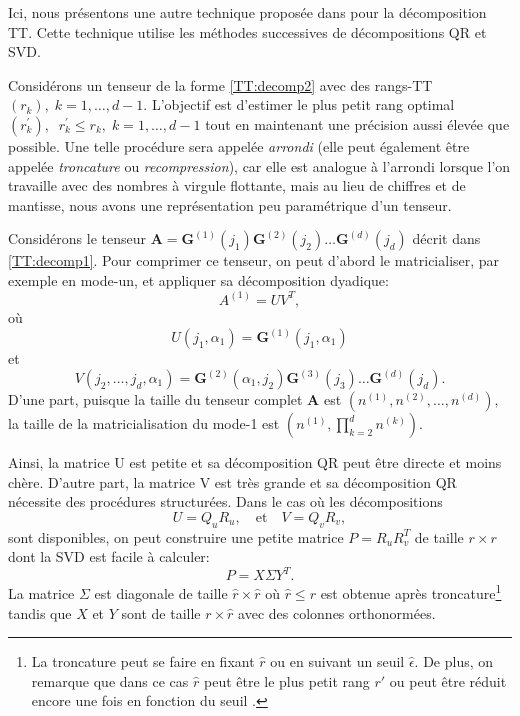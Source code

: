 \documentclass[11pt,a4paper,oneside]{book}
\def\G{\mathfrak G}
\def\G{\mathbf G}
\newcommand{\mbf}[1]{\mathbf{#1}}
\begin{document}
	Ici, nous présentons une autre technique proposée dans \cite[p.2302]{oseledets2011tensor} pour la décomposition TT. Cette technique utilise les méthodes successives de décompositions QR et SVD.
	
	 Considérons un tenseur de la forme \eqref{TT:decomp2} avec des rangs-TT $(r_k),\; k = 1,\ldots,d-1.$ L'objectif est d'estimer le
	 plus petit rang optimal $(r_k^{'}),\;\; r_k^{'} \leq r_k, \; k = 1,\ldots,d-1$ tout en maintenant une précision aussi élevée que possible. Une telle procédure sera appelée \textit{arrondi} (elle peut également être appelée \textit{troncature} ou \textit{recompression}), car elle est analogue à l'arrondi lorsque l'on travaille avec des nombres à virgule flottante, mais au lieu de chiffres et de
	 mantisse, nous avons une représentation peu paramétrique d'un tenseur.
	 
	Considérons le tenseur  $\mbf{A} = \G^{(1)}(j_1)\G^{(2)}(j_2)\ldots \G^{(d)}(j_d)$ décrit dans \eqref{TT:decomp1}. Pour comprimer ce tenseur, on peut d'abord le matricialiser, par exemple en mode-un, et appliquer sa décomposition dyadique:
		\begin{equation}
	\label{TT-dyadicMod1}
	A^{(1)} = UV^T, 
	\end{equation}
où
	\begin{equation}
	\label{dyadicDecomp1}
	U(j_1,\alpha_1) = \G^{(1)}(j_1,\alpha_1)
	\end{equation}
	et
	\begin{equation}
	\label{dyadicDecomp2}
	V(j_2,\ldots,j_d,\alpha_1) = \G^{(2)}(\alpha_1,j_2)\G^{(3)}(j_3)\ldots \G^{(d)}(j_d).
	\end{equation}
	D'une part, puisque la taille du tenseur complet $\mbf{A}$ est $(n^{(1)},n^{(2)},\ldots,n^{(d)}),$ la taille de la matricialisation du mode-1 est $(n^{(1)}, \prod_{k =2}^d n^{(k)}).$
	
	Ainsi, la matrice U est petite et sa décomposition QR peut être directe et moins chère. D'autre part, la matrice V est très grande et sa décomposition QR nécessite des procédures structurées. Dans le cas où les décompositions
	\begin{equation}
	\label{qrTTred}
	U = Q_uR_u,\quad \text{et}\quad V = Q_vR_v,
	\end{equation}
	sont disponibles, on peut construire une petite matrice   $P = R_uR_v^T$ de taille  $r \times r$ dont la SVD est facile à calculer:
	\begin{equation}
	\label{svdTTred}
	P = X\Sigma Y^T.
	\end{equation}
	La matrice $\Sigma$ est diagonale de taille $\hat{r} \times \hat{r}$ où $\hat{r} \leq r$  est obtenue après troncature\footnote{La troncature peut se faire en fixant $\hat{r}$ ou en suivant un seuil $\hat{\epsilon}.$ De plus, on remarque que dans ce cas $\hat{r}$ peut être le plus petit rang $ r' $  ou peut être réduit encore une fois en fonction du seuil \cite[p.152]{Nyenyezi2018}.} tandis que $ X $ et $ Y $ sont de taille  $r \times \hat{r}$ avec des colonnes orthonormées.
	
\end{document}
